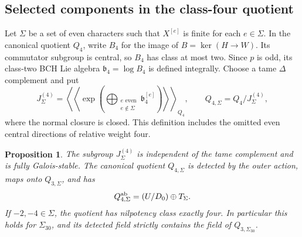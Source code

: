 \documentclass[11pt]{article}
\newtheorem{proposition}[theorem]{Proposition}
\theoremstyle{definition}\newtheorem{definition}[theorem]{Definition}
\begin{document}
\subsection{Selected components in the class-four quotient}
\label{subsec:selected-class-four}

Let $\Sigma$ be a set of even characters such that
$X^{[e]}$ is finite for each $e\in\Sigma$. In the
canonical quotient $Q_4$, write $B_4$ for the image
of $B=\ker(H\to W)$. Its commutator subgroup is
central, so $B_4$ has class at most two. Since $p$
is odd, its class-two BCH Lie algebra
$\mathfrak b_4=\log B_4$ is defined integrally.
Choose a tame $\Delta$ complement and put
\[
 J_\Sigma^{(4)}=
 \left\langle\!\left\langle
 \exp\!\left(\bigoplus_{\substack{e\text{ even}\\e\notin\Sigma}}
                         \mathfrak b_4^{[e]}\right)
 \right\rangle\!\right\rangle_{Q_4},\qquad
 Q_{4,\Sigma}=Q_4/J_\Sigma^{(4)},
\]
where the normal closure is closed. This definition
includes the omitted even central directions of
relative weight four.

\begin{proposition}\label{prop:selected-class-four}
The subgroup $J_\Sigma^{(4)}$ is independent of the
tame complement and is fully Galois-stable. The
canonical quotient $Q_{4,\Sigma}$ is detected by the
outer action, maps onto $Q_{3,\Sigma}$, and has
\[
             Q_{4,\Sigma}^{\rm ab}=(U/D_0)\oplus T_\Sigma.
\]
If $-2,-4\in\Sigma$, the quotient has nilpotency class
exactly four. In particular this holds for $\Sigma_{30}$,
and its detected field strictly contains the field
of $Q_{3,\Sigma_{30}}$.
\end{proposition}
\end{document}
